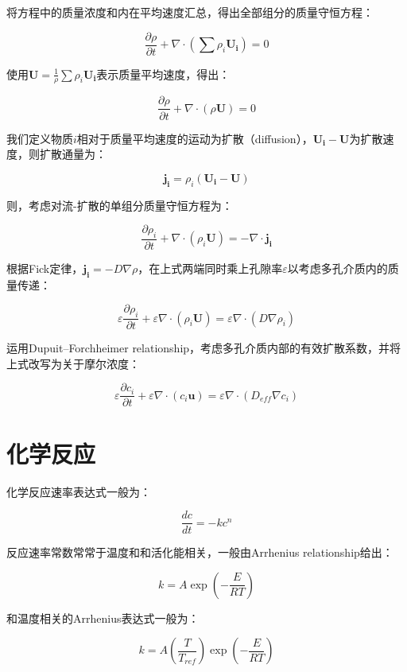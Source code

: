 将方程中的质量浓度和内在平均速度汇总，得出全部组分的质量守恒方程：

\begin{equation}
\frac{\partial \rho}{\partial t} + \nabla\cdot(\sum\rho_i\bm{U_i}) = 0
\end{equation}

使用$ \bm{U}=\frac{1}{\rho}\sum\rho_i\bm{U_i} $表示质量平均速度，得出：

\begin{equation}
\frac{\partial \rho}{\partial t} + \nabla\cdot(\rho\bm{U}) = 0
\end{equation}

我们定义物质$ i $相对于质量平均速度的运动为扩散（diffusion），$ \bm{U_i}-\bm{U} $为扩散速度，则扩散通量为：

\begin{equation}
\bm{j_i} = \rho_i(\bm{U_i} - \bm{U})
\end{equation}

则，考虑对流-扩散的单组分质量守恒方程为：

\begin{equation}
\frac{\partial \rho_i}{\partial t} + \nabla\cdot(\rho_i\bm{U}) = -\nabla\cdot \bm{j_i}
\end{equation}

根据Fick定律，$ \bm{j_i} = -D\nabla\rho $，在上式两端同时乘上孔隙率$ \varepsilon $以考虑多孔介质内的质量传递：

\begin{equation}
\varepsilon\frac{\partial \rho_i}{\partial t} + \varepsilon\nabla\cdot(\rho_i\bm{U}) = \varepsilon\nabla\cdot(D\nabla \rho_i)
\end{equation}

运用Dupuit–Forchheimer relationship，考虑多孔介质内部的有效扩散系数，并将上式改写为关于摩尔浓度：

\begin{equation}
\varepsilon\frac{\partial c_i}{\partial t} + \varepsilon\nabla\cdot(c_i\bm{u}) = \varepsilon\nabla\cdot(D_{eff}\nabla c_i)
\end{equation}

\section{化学反应}

化学反应速率表达式一般为：

\begin{equation}
\frac{dc}{dt} = -kc^n
\end{equation}

反应速率常数常常于温度和和活化能相关，一般由Arrhenius relationship给出：

\begin{equation}
k = A \exp(-\frac{E}{RT})
\end{equation}

和温度相关的Arrhenius表达式一般为：

\begin{equation}
k = A \left( \frac{T}{T_{ref}} \right) \exp(-\frac{E}{RT})
\end{equation}

